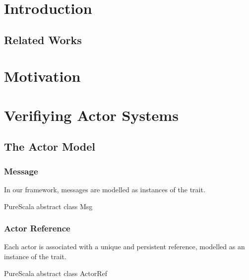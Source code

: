 

\clearpage
\pagestyle{mystyle}

\section{Introduction}


\subsection*{Related Works}


\section{Motivation}
\label{motivation}



\clearpage
\section{Verifiying Actor Systems}
\label{actors}

\subsection{The Actor Model}


\cite{actario}

\subsubsection{Message}

In our framework, messages are modelled as instances of the  trait.

\begin{ShortCode}{PureScala}
abstract class Msg
\end{ShortCode}

\subsubsection{Actor Reference}

Each actor is associated with a unique and persistent reference, modelled as an instance
of the \ActorRef trait.

\begin{ShortCode}{PureScala}
abstract class ActorRef
\end{ShortCode}

